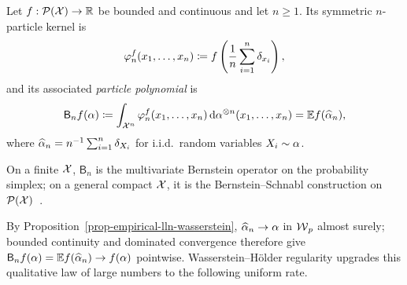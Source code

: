 \begin{defn}\label{def-particle-polynomial}
	Let \(f:\mathcal{P}(\mathcal{X})\to\mathbb{R}\) be bounded and continuous and let \(n\geq1\). Its symmetric \(n\)-particle kernel is
	\[
		\varphi_n^f(x_1,\ldots,x_n)
		\coloneqq
		f\left(\frac1n\sum_{i=1}^n\delta_{x_i}\right),
	\]
	and its associated \emph{particle polynomial} is
	\begin{equation}\label{eq-empirical-particle-polynomial}
		\mathsf B_n f(\alpha)
		\coloneqq
		\int_{\mathcal{X}^n}\varphi_n^f(x_1,\ldots,x_n)
		\,\mathrm{d}\alpha^{\otimes n}(x_1,\ldots,x_n)
		=
		\mathbb{E} f(\widehat{\alpha}_n),
	\end{equation}
	where \(\widehat{\alpha}_n=n^{-1}\sum_{i=1}^n\delta_{X_i}\) for i.i.d.\ random variables \(X_i\sim\alpha\).
\end{defn}

On a finite \(\mathcal{X}\), \(\mathsf B_n\) is the multivariate Bernstein operator on the probability simplex; on a general compact \(\mathcal{X}\), it is the Bernstein--Schnabl construction on \(\mathcal{P}(\mathcal{X})\)~\cite{schnabl1969bernstein}.

By Proposition~\ref{prop-empirical-lln-wasserstein}, \(\widehat{\alpha}_n\to\alpha\) in \(\operatorname{\mathcal{W}}_p\) almost surely; bounded continuity and dominated convergence therefore give \(\mathsf B_n f(\alpha)=\mathbb{E} f(\widehat{\alpha}_n)\to f(\alpha)\) pointwise. Wasserstein--H\"older regularity upgrades this qualitative law of large numbers to the following uniform rate.

